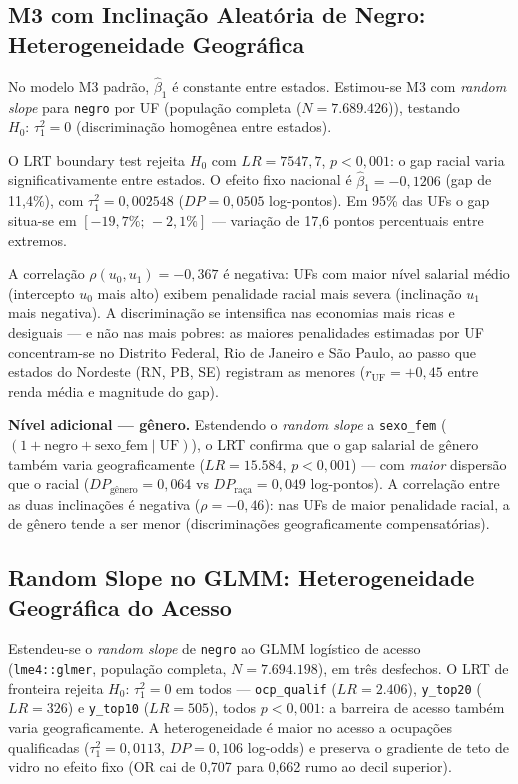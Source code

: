 \documentclass[12pt, a4paper, oneside]{article}
\begin{document}
\subsection{M3 com Inclinação Aleatória de Negro: Heterogeneidade Geográfica}
\label{subsec:hlm_rs}

No modelo M3 padrão, $\hat{\beta}_1$ é constante entre estados.
Estimou-se M3 com \textit{random slope} para \texttt{negro} por UF
(população completa ($N=7.689.426$)),
testando $H_0{\colon}\,\tau^2_1 = 0$ (discriminação homogênea entre estados).

O LRT boundary test \cite{stram1994} rejeita $H_0$ com $LR=7547,7$, $p<0{,}001$: o gap racial varia significativamente entre estados. O efeito fixo nacional é $\hat{\beta}_1=−0,1206$ (gap de 11,4\%), com $\tau^2_1=0,002548$ ($DP=0,0505$ log-pontos). Em 95\% das UFs o gap situa-se em $[−19,7\%;\,−2,1\%]$ --- variação de 17,6 pontos percentuais entre extremos.

A correlação $\rho(u_0,u_1)=−0,367$ é negativa: UFs com maior nível salarial médio (intercepto $u_0$ mais alto) exibem penalidade racial mais severa (inclinação $u_1$ mais negativa). A discriminação se intensifica nas economias mais ricas e desiguais --- e não nas mais pobres: as maiores penalidades estimadas por UF concentram-se no Distrito Federal, Rio de Janeiro e São Paulo, ao passo que estados do Nordeste (RN, PB, SE) registram as menores ($r_{\text{UF}}=+0{,}45$ entre renda média e magnitude do gap).

\medskip
\noindent\textbf{Nível adicional --- gênero.} Estendendo o \textit{random slope} a \texttt{sexo\_fem} ($(1+\text{negro}+\text{sexo\_fem}\mid \text{UF})$), o LRT confirma que o gap salarial de gênero também varia geograficamente ($LR=15.584$, $p<0{,}001$) --- com \emph{maior} dispersão que o racial ($DP_{\text{gênero}}=0,064$ vs $DP_{\text{raça}}=0,049$ log-pontos). A correlação entre as duas inclinações é negativa ($\rho=−0,46$): nas UFs de maior penalidade racial, a de gênero tende a ser menor (discriminações geograficamente compensatórias).

\subsection{Random Slope no GLMM: Heterogeneidade Geográfica do Acesso}
\label{subsec:glmm_rs}

Estendeu-se o \textit{random slope} de \texttt{negro} ao GLMM logístico de acesso (\texttt{lme4::glmer}, população completa, $N=7.694.198$), em três desfechos. O LRT de fronteira rejeita $H_0{\colon}\,\tau^2_1=0$ em todos --- \texttt{ocp\_qualif} ($LR=2.406$), \texttt{y\_top20} ($LR=326$) e \texttt{y\_top10} ($LR=505$), todos $p<0{,}001$: a barreira de acesso também varia geograficamente. A heterogeneidade é maior no acesso a ocupações qualificadas ($\tau^2_1=0,0113$, $DP=0,106$ log-odds) e preserva o gradiente de teto de vidro no efeito fixo (OR cai de 0,707 para 0,662 rumo ao decil superior).
\end{document}
